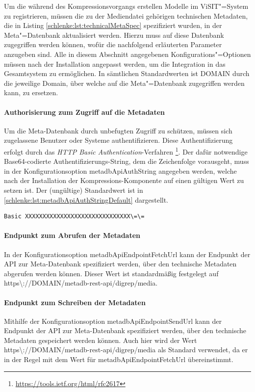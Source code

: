 Um die während des Kompressionsvorgangs erstellen Modelle im ViSIT"=System zu registrieren, müssen die zu der Mediendatei gehörigen technischen Metadaten, die in Listing \ref{schlenke:lst:technicalMetaSpec} spezifiziert wurden, in der Meta"=Datenbank aktualisiert werden. Hierzu muss auf diese Datenbank zugegriffen werden können, wofür die nachfolgend erläuterten Parameter anzugeben sind. Alle in diesem Abschnitt angegebenen Konfigurations"=Optionen müssen nach der Installation angepasst werden, um die Integration in das Gesamtsystem zu ermöglichen. In sämtlichen Standardwerten ist {\ttfamily DOMAIN} durch die jeweilige Domain, über welche auf die Meta"=Datenbank zugegriffen werden kann, zu ersetzen.

\paragraph{Authorisierung zum Zugriff auf die Metadaten} Um die Meta-Datenbank durch unbefugten Zugriff zu schützen, müssen sich zugelassene Benutzer oder Systeme authentifizieren. Diese Authentifizierung erfolgt durch das \emph{HTTP Basic Authentication}-Verfahren \footnote{\url{https://tools.ietf.org/html/rfc2617}}. Der dafür notwendige Base64-codierte Authentifizierungs-String, dem die Zeichenfolge \grqq{} vorausgeht, muss in der Konfigurationsoption {\ttfamily metadb\-Api\-Auth\-String} angegeben werden, welche nach der Installation der Kompressions-Komponente auf einen gültigen Wert zu setzen ist. Der (ungültige) Standardwert ist in \autoref{schlenke:lst:metadbApiAuthStringDefault} dargestellt.

\begin{lstlisting}[caption={Standardwert für die Konfigurationsoption {\ttfamily metadb\-Api\-Auth\-String}},label=schlenke:lst:metadbApiAuthStringDefault]
	Basic XXXXXXXXXXXXXXXXXXXXXXXXXXXXXX\=\=
\end{lstlisting}

\paragraph{Endpunkt zum Abrufen der Metadaten} In der Konfigurationsoption {\ttfamily metadb\-Api\-Endpoint\-Fetch\-Url} kann der Endpunkt der API zur Meta-Datenbank spezifiziert werden, über den technische Metadaten abgerufen werden können. Dieser Wert ist standardmäßig festgelegt auf {\ttfamily https\textbackslash ://DOMAIN/metadb-rest-api/digrep/media}.

\paragraph{Endpunkt zum Schreiben der Metadaten} Mithilfe der Konfigurationsoption {\ttfamily metadb\-Api\-Endpoint\-Send\-Url} kann der Endpunkt der API zur Meta-Datenbank spezifiziert werden, über den technische Metadaten gespeichert werden können. Auch hier wird der Wert {\ttfamily https\textbackslash ://DOMAIN/metadb-rest-api/digrep/media} als Standard verwendet, da er in der Regel mit dem Wert für {\ttfamily metadb\-Api\-Endpoint\-Fetch\-Url} übereinstimmt.

